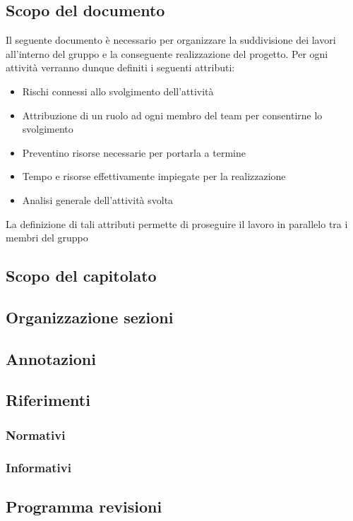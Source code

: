 \subsection{Scopo del documento}
Il seguente documento è necessario per organizzare la suddivisione dei lavori all'interno del gruppo e la conseguente realizzazione del progetto. Per ogni attività verranno dunque definiti i seguenti attributi: 
\begin{itemize}
    \item Rischi connessi allo svolgimento dell'attività
    \item Attribuzione di un ruolo ad ogni membro del team per consentirne lo svolgimento
    \item Preventino risorse necessarie per portarla a termine
    \item Tempo e risorse effettivamente impiegate per la realizzazione
    \item Analisi generale dell'attività svolta
\end{itemize}
La definizione di tali attributi permette di proseguire il lavoro in parallelo tra i membri del gruppo
\subsection{Scopo del capitolato}
\subsection{Organizzazione sezioni}
\subsection{Annotazioni}
\subsection{Riferimenti}
\subsubsection{Normativi}
\subsubsection{Informativi}
\subsection{Programma revisioni}